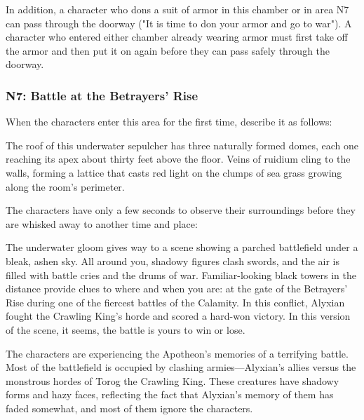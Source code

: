 \documentclass[letterpaper, 11pt, bg=full, twocolumn]{dndbook}
\begin{document}
In addition, a character who dons a suit of armor in this chamber or in area N7 can pass through the doorway ("It is time to don your armor and go to war"). A character who entered either chamber already wearing armor must first take off the armor and then put it on again before they can pass safely through the doorway.


\subsubsection{N7: Battle at the Betrayers' Rise}

When the characters enter this area for the first time, describe it as follows:

\begin{DndReadAloud}
The roof of this underwater sepulcher has three naturally formed domes, each one reaching its apex about thirty feet above the floor. Veins of ruidium cling to the walls, forming a lattice that casts red light on the clumps of sea grass growing along the room's perimeter.
\end{DndReadAloud}

The characters have only a few seconds to observe their surroundings before they are whisked away to another time and place:

\begin{DndReadAloud}
The underwater gloom gives way to a scene showing a parched battlefield under a bleak, ashen sky. All around you, shadowy figures clash swords, and the air is filled with battle cries and the drums of war.
Familiar-looking black towers in the distance provide clues to where and when you are: at the gate of the Betrayers' Rise during one of the fiercest battles of the Calamity. In this conflict, Alyxian fought the Crawling King's horde and scored a hard-won victory. In this version of the scene, it seems, the battle is yours to win or lose.
\end{DndReadAloud}

The characters are experiencing the Apotheon's memories of a terrifying battle. Most of the battlefield is occupied by clashing armies---Alyxian's allies versus the monstrous hordes of Torog the Crawling King. These creatures have shadowy forms and hazy faces, reflecting the fact that Alyxian's memory of them has faded somewhat, and most of them ignore the characters.
\end{document}
